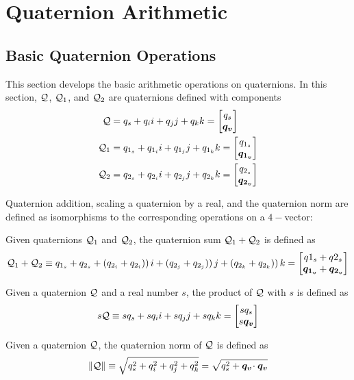 \section{Quaternion Arithmetic}\label{sec:app_arith}

\subsection{Basic Quaternion Operations}

This section develops the basic arithmetic operations on quaternions.
In this section,
$\mathcal{Q}$, $\mathcal{Q}_1$, and $\mathcal{Q}_2$
are quaternions defined with components
\begin{align*}
\quat Q    &= q_s + q_i i + q_j j + q_k k
            = \quatsv {q_s} {\vect{q_v}} \\
\quat{Q}_1 &= q_{1_s} + q_{1_i} i + q_{1_j} j + q_{1_k} k 
            = \quatsv{q_{1_s}}{\vect{q_{1_v}}} \\
\quat{Q}_2 &= q_{2_s} + q_{2_i} i + q_{2_j} j + q_{2_k} k
            = \quatsv{q_{2_s}}{\vect{q_{2_v}}}
\end{align*}

Quaternion addition, scaling a quaternion by a real, and the quaternion norm
are defined as isomorphisms to the corresponding operations on a $4-$vector:
\begin{definition}\label{def:quat_sum}
Given quaternions $\mathcal{Q}_1$ and $\mathcal{Q}_2$,
the quaternion sum $\mathcal{Q}_1 + \mathcal{Q}_2$ is defined as
\begin{equation}
{\quat{Q}_1} + {\quat{Q}_2} \equiv
         q_{1_s} + q_{2_s} 
    + (q_{2_i}  + q_{2_i}))\,i
    + (q_{2_j}  + q_{2_j}))\,j
    + (q_{2_k}  + q_{2_k}))\,k
    = \quatsv{q1_s+q2_s} {\vect{q_{1_v}}+\vect{q_{2_v}}}
  \label{eqn:quat_sum_def}
\end{equation}
\end{definition}

\begin{definition}\label{def:quat_scale}
Given a quaternion $\mathcal{Q}$ and a real number $s$,
the product of $\mathcal{Q}$ with $s$ is defined as
\begin{equation}
s \quat Q \equiv s q_s + s q_i i + s q_j j + s q_k k
  = \quatsv {s q_s} {s \vect{q_v}}
\label{eqn:quat_prod_scalar}
\end{equation}
\end{definition}

\begin{definition}\label{def:quat_norm}
Given a quaternion $\mathcal{Q}$,
the quaternion norm of $\mathcal{Q}$ is defined as
\begin{equation}
\lVert\mathcal{Q}\rVert \equiv \sqrt{q_s^2 + q_i^2 + q_j^2 + q_k^2}
  = \sqrt{q_s^2 + \boldsymbol{q_{v}} \!\cdot \boldsymbol{q_{v}}}
\label{eqn:quat_norm_def}
\end{equation}
\end{definition}

